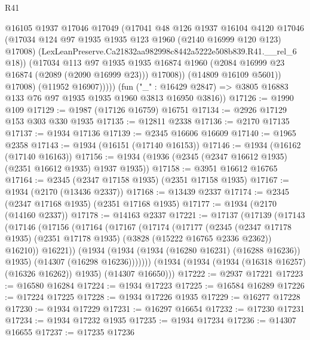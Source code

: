 \begin{lexlean}{R41}
\begin{coremodule}
                    @16105
                    @1937
                    @17046
                    @17049
                    (@17041
                      @48
                      @126
                      @1937
                      @16104
                      @4120
                      @17046
                      (@17034 @124 @97 @1935 @1935 @123 @1960 (@2140 @16999 @120 @123) @17008)
                      (LexLeanPreserve.Ca21832aa982998c8442a5222e508b839.R41.__rel_6 @18))
                    (@17034
                      @113
                      @97
                      @1935
                      @1935
                      @16874
                      @1960
                      (@2084 @16999 @23 @16874 (@2089 (@2090 @16999 @23)))
                      @17008))
                  (@14809 @16109 @5601))
                @17008)
              (@11952 @16907)))))
      (fun ("_" : @16429 @2847) => @3805 @16883 @133 @76 @97 @1935 @1935 @1960 @3813 @16950 @3816))
@17126 := @1990 @109
@17129 := @1987 (@17126 @16759) @16751
@17134 := @2926 @17129 @153 @303 @330 @1935
@17135 := @12811 @2338
@17136 := @2170 @17135
@17137 := @1934 @17136
@17139 := @2345 @16606 @16609
@17140 := @1965 @2358
@17143 := @1934 (@16151 (@17140 @16153))
@17146 := @1934 (@16162 (@17140 @16163))
@17156 := @1934 (@1936 (@2345 (@2347 @16612 @1935) (@2351 @16612 @1935) @1937 @1935))
@17158 := @3951 @16612 @16765
@17164 := @2345 (@2347 @17158 @1935) (@2351 @17158 @1935)
@17167 := @1934 (@2170 (@13436 @2337))
@17168 := @13439 @2337
@17174 := @2345 (@2347 @17168 @1935) (@2351 @17168 @1935)
@17177 := @1934 (@2170 (@14160 @2337))
@17178 := @14163 @2337
@17221 := @17137
    (@17139
      (@17143
        (@17146
          (@17156
            (@17164
              (@17167
                (@17174
                  (@17177
                    (@2345
                      (@2347 @17178 @1935)
                      (@2351 @17178 @1935)
                      (@3828 (@15222 @16765 @2336 @2362))
                      @16210))
                  @16221))
              (@1934
                (@1934 (@1934 (@16280 @16231) (@16288 @16236)) @1935)
                (@14307 (@16298 @16236)))))))
      (@1934 (@1934 (@1934 (@16318 @16257) (@16326 @16262)) @1935) (@14307 @16650)))
@17222 := @2937 @17221
@17223 := @16580 @16284
@17224 := @1934 @17223
@17225 := @16584 @16289
@17226 := @17224 @17225
@17228 := @1934 @17226 @1935
@17229 := @16277 @17228
@17230 := @1934 @17229
@17231 := @16297 @16654
@17232 := @17230 @17231
@17234 := @1934 @17232 @1935
@17235 := @1934 @17234
@17236 := @14307 @16655
@17237 := @17235 @17236

\end{coremodule}
\end{lexlean}
